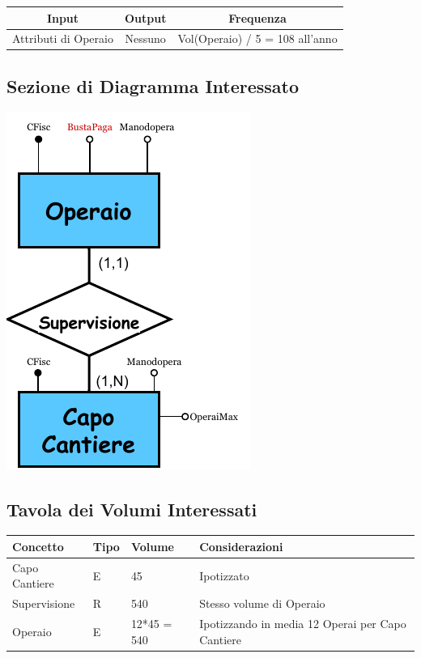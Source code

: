 \documentclass[12pt,a4paper]{report}
\begin{document}
        \begin{center}
            \begin{tabular}{|c|c|c|}
                \hline
                \rowcolor{viola} \textbf{Input} & \textbf{Output} & \textbf{Frequenza} \\ \hline
                Attributi di Operaio & Nessuno & Vol(Operaio) / 5 = 108 all'anno \\ \hline
            \end{tabular}
        \end{center}
        
        \subsection{Sezione di Diagramma Interessato}
        \begin{center}
            \includegraphics[scale=1.2]{sezione_operazione6.pdf}
        \end{center}
        
        \subsection{Tavola dei Volumi Interessati}
        \begin{tabular}{|p{4cm}|p{1cm}|p{3cm}|p{8cm}|}
            \hline
            \textbf{Concetto} & \textbf{Tipo} & \textbf{Volume} & \textbf{Considerazioni} \\ \hline
            Capo Cantiere & E & 45 & Ipotizzato \\ \hline
            Supervisione & R & 540 & Stesso volume di Operaio \\ \hline
            Operaio & E & 12*45 = 540 & Ipotizzando in media 12 Operai per Capo Cantiere \\ \hline
        \end{tabular}
        
\end{document}
